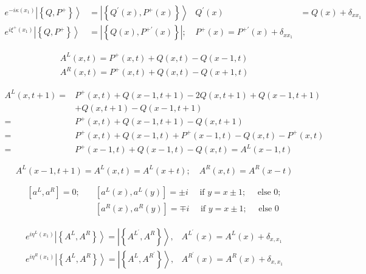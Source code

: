 \documentclass[main.tex]{subfiles}
\begin{document}
\begin{equation}\label{17.41}
	\begin{aligned} e^{-i \kappa\left(x_{1}\right)}\left|\left\{Q, P^{+}\right\}\right\rangle &=\left|\left\{Q^{\prime}(x), P^{+}(x)\right\}\right\rangle & Q^{\prime}(x) &=Q(x)+\delta_{x x_{1}} \\ e^{i \xi^{+}\left(x_{1}\right)}\left|\left\{Q, P^{+}\right\}\right\rangle &=\left|\left\{Q(x), P^{+\prime}(x)\right\}\right| ; & P^{+}(x)=P^{+\prime}(x)+\delta_{x x_{1}} \end{aligned}
\end{equation}


\begin{equation}\label{17.43}
	\begin{array}{l}{A^{L}(x, t)=P^{+}(x, t)+Q(x, t)-Q(x-1, t)} \\ {A^{R}(x, t)=P^{+}(x, t)+Q(x, t)-Q(x+1, t)}\end{array}
\end{equation}


\begin{equation}\label{17.45}
	\begin{aligned} A^{L}(x, t+1)=& P^{+}(x, t)+Q(x-1, t+1)-2 Q(x, t+1)+Q(x-1, t+1) \\ &+Q(x, t+1)-Q(x-1, t+1) \\=& P^{+}(x, t)+Q(x-1, t+1)-Q(x, t+1) \\=& P^{+}(x, t)+Q(x-1, t)+P^{+}(x-1, t)-Q(x, t)-P^{+}(x, t) \\=& P^{+}(x-1, t)+Q(x-1, t)-Q(x, t)=A^{L}(x-1, t) \end{aligned}
\end{equation}


\begin{equation}\label{17.46}
	A^{L}(x-1, t+1)=A^{L}(x, t)=A^{L}(x+t) ; \quad A^{R}(x, t)=A^{R}(x-t)
\end{equation}

\begin{equation}\label{17.47}
	\begin{aligned}\left[a^{L}, a^{R}\right]=0 ; \quad &\left[a^{L}(x), a^{L}(y)\right]=\pm i \quad \text { if } y=x \pm 1 ; \quad \text { else } 0 ; \\ &\left[a^{R}(x), a^{R}(y)\right]=\mp i \quad \text { if } y=x \pm 1 ; \quad \text { else } 0 \end{aligned}
\end{equation}



\begin{equation}\label{17.49}
	\begin{array}{ll}{e^{i \eta^{L}\left(x_{1}\right)}\left|\left\{A^{L}, A^{R}\right\}\right\rangle=\left|\left\{A^{L^{\prime}}, A^{R}\right\}\right\rangle,} & { A^{L^{\prime}}(x)=A^{L}(x)+\delta_{x, x_{1}}} \\ {e^{i \eta^{R}\left(x_{1}\right)}\left|\left\{A^{L}, A^{R}\right\}\right\rangle=\left|\left\{A^{L}, A^{R^{\prime}}\right\}\right\rangle,} & { A^{R^{\prime}}(x)=A^{R}(x)+\delta_{x, x_{1}}}\end{array}
\end{equation}
\end{document}

